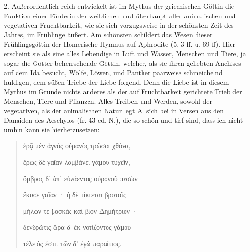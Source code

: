 \documentclass[a4paper, 11pt, oneside]{article}
\begin{document}
2. Außerordentlich reich entwickelt ist im Mythus der griechischen Göttin die Funktion einer Förderin der weiblichen und überhaupt aller animalischen und vegetativen Fruchtbarkeit, wie sie sich vorzugsweise in der schönsten Zeit des Jahres, im Frühlinge äußert. Am schönsten schildert das Wesen dieser Frühlingsgöttin der Homerische Hymnus auf Aphrodite (5. 3 ff. u. 69 ff). Hier erscheint sie als eine alles Lebendige in Luft und Wasser, Menschen und Tiere, ja sogar die Götter beherrschende Göttin, welcher, als sie ihren geliebten Anchises auf dem Ida besucht, Wölfe, Löwen, und Panther paarweise schmeichelnd huldigen, dem süßen Triebe der Liebe folgend. Denn die Liebe ist in diesem Mythus im Grunde nichts anderes als der auf Fruchtbarkeit gerichtete Trieb der Menschen, Tiere und Pflanzen. Alles Treiben und Werden, sowohl der vegetativen, als der animalischen Natur legt A. sich bei in Versen aus den Danaiden des Aeschylos (fr. 43 ed. N.), die so schön und tief sind, dass ich nicht umhin kann sie hierherzusetzen:
\begin{quotation}
ἐρᾷ μὲν ἁγνὸς οὐρανὸς τρῶσαι χθόνα,

ἔρως δὲ γαῖαν λαμβάνει γάμου τυχεῖν,

ὄμβρος δ' ἀπ' εὐνάεντος οὐρανοῦ πεσὼν

ἔκυσε γαῖαν · ἡ δὲ τίκτεται βροτοῖς

μήλων τε βοσκὰς καὶ βίον Δημήτριον ·

δενδρῶτις ὥρα δ' ἐκ νοτίζοντος γάμου

τέλειός ἐστι. τῶν δ' ἐγὼ παραίτιος.
\end{quotation}
\end{document}
